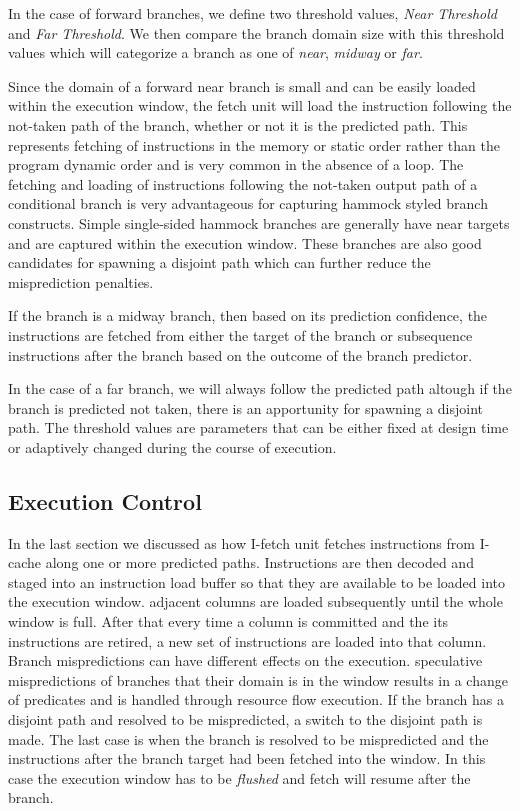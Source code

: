 \documentclass[10pt,twocolumn]{IEEEtran}
\begin{document}
In the case of forward branches, we define two threshold values,
\emph{Near Threshold} and \emph{Far Threshold}.  We then compare the
branch domain size with this threshold values which will categorize a
branch as one of \emph{near}, \emph{midway} or \emph{far}.

Since the domain of a forward near branch is small and can be easily
loaded within the execution window, the fetch unit will load the
instruction following the not-taken path of the branch, whether or not
it is the predicted path.  This represents fetching of instructions in
the memory or static order rather than the program dynamic order and is
very common in the absence of a loop.  The fetching and loading of
instructions following the not-taken output path of a conditional
branch is very advantageous for capturing hammock styled branch
constructs.  Simple single-sided hammock branches are generally have
near targets and are captured within the execution window.  These
branches are also good candidates for spawning a disjoint path which
can further reduce the misprediction penalties.

If the branch is a midway branch, then based on its prediction
confidence, the instructions are fetched from either the target of the
branch or subsequence instructions after the branch based on the
outcome of the branch predictor.

In the case of a far branch, we will always follow the predicted path
altough if the branch is predicted not taken, there is an apportunity
for spawning a disjoint path.
The threshold values are parameters that can be either fixed at 
design time or adaptively changed during the course of execution. 

\subsection {Execution Control}

In the last section we discussed as how I-fetch unit  fetches
instructions from I-cache along one or more predicted paths.
Instructions are then decoded and staged into an instruction load
buffer so that they are available to be loaded into the execution
window.  adjacent columns are loaded subsequently until the whole
window is full.  After that every time a column is committed and the
its instructions are retired, a new set of instructions are loaded into
that column.  Branch mispredictions can have different effects on the
execution.  speculative mispredictions of branches that their domain is
in the window results in a change of predicates and is handled through
resource flow execution.  If the branch has a disjoint path and
resolved to be mispredicted, a switch to the disjoint path is made.
The last case is when the branch is resolved to be mispredicted and the
instructions after the branch target had been fetched into the window.
In this case the execution window has to be \emph{flushed} and fetch
will resume after the branch.
\end{document}
